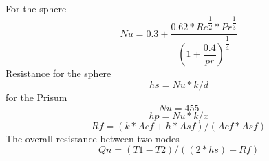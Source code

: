 \documentclass[compileTAMUreport.tex]{subfiles}
\begin{document}
For the sphere
\begin{equation}
Nu = 0.3 + \dfrac{0.62*Re^{\dfrac{1}{2}}*Pr^{\dfrac{1}{3}}}{\left( 1+{{\dfrac{0.4}{pr}}}\right) ^{\dfrac{1}{4}}  } 
\end{equation}
Resistance for the sphere
\begin{equation}
hs=Nu*k/d
\end{equation}
for the Prisum
\begin{equation}
Nu=455 %
\end{equation}
\begin{equation}
hp=Nu*k/x
\end{equation}
\begin{equation}
Rf={\left(k*Acf+h*Asf\right)}/{\left(Acf*Asf\right)}
\end{equation}
The overall resistance between two nodes
\begin{equation}
Qn={\left(T1-T2\right)}/{\left({\left(2*hs\right)+Rf}\right)}
\end{equation}
\end{document}
